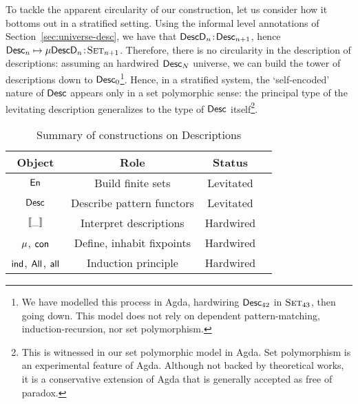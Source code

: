 
To tackle the apparent circularity of our construction, let us
consider how it bottoms out in a stratified setting. Using the
informal level annotations of Section~\ref{sec:universe-desc}, we have
that \(\Bhab{\DescD_n}{\Desc_{n+1}}\), hence \(\Bhab{\Desc_n \mapsto
  \Mu{\DescD_n}}{\Set_{n+1}}\). Therefore, there is no circularity in
the description of descriptions: assuming an hardwired $\Desc_N$
universe, we can build the tower of descriptions down to
$\Desc_0$\footnote{We have modelled this process in Agda, hardwiring
  $\Desc_{42}$ in $\Set_{43}$, then going down. This model does not
  rely on dependent pattern-matching, induction-recursion, nor set
  polymorphism.}. Hence, in a stratified system, the `self-encoded'
nature of $\Desc$ appears only in a set polymorphic sense: the
principal type of the levitating description generalizes to the type
of $\Desc$ itself\footnote{This is witnessed in our set polymorphic
  model in Agda. Set polymorphism is an experimental feature of
  Agda. Although not backed by theoretical works, it is a conservative
  extension of Agda that is generally accepted as free of paradox.}.

\begin{table}

{
\begin{center}
\begin{tabular}{|c|c|c|c|}
\hline
Object                & Role                        & Status \\
\hline
\hline
$\EnumU$              & Build finite sets           & Levitated \\
\hline
$\Desc$               & Describe pattern functors   & Levitated \\
\hline
$\SYMBdescop{\_}$     & Interpret descriptions      & Hardwired \\
\hline
$\SYMBMu$, $\SYMBCon$ & Define, inhabit fixpoints   & Hardwired \\
\hline
$\SYMBind$, $\SYMBAll$, $\SYMBall$  
                      & Induction principle         & Hardwired \\
\hline
\end{tabular}
\end{center}
}

\caption{Summary of constructions on Descriptions}
\label{tab:sumup-operators}

\end{table}
